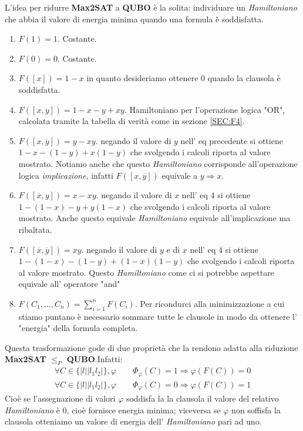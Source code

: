 \documentclass[a4paper]{article}
\begin{document}
L'idea per ridurre \textbf{Max2SAT} a \textbf{QUBO} è la solita: individuare un \textit{Hamiltoniano} che abbia il valore di energia minima quando una formula è soddisfatta.
\begin{enumerate}
	\item $F(1)=1$. Costante. 
	\item $F(0)=0$. Costante. 
	\item $F([x])=1-x$ in quanto desideriamo ottenere 0 quando la clausola è soddisfatta.
	\item $F([x,y])= 1-x-y +xy$. Hamiltoniano per l'operazione logica "OR", calcolata tramite la tabella di verità come in sezione \ref{SEC:F4}.
	\item $F([x,\overline y])= y - xy$. negando il valore di $y$ nell' eq precedente si ottiene $1-x-(1-y)+x(1-y)$ che svolgendo i calcoli riporta al valore mostrato.
		Notiamo anche che questo \textit{Hamiltoniano} corrisponde all'operazione logica \textit{implicazione}, infatti $F([x,\overline y])$ equivale a $ y \Rightarrow x$.
	\item $F([\overline x, y])= x - xy$. negando il valore di $x$ nell' eq 4 si ottiene $1-(1-x)-y+y(1-x)$ che svolgendo i calcoli riporta al valore mostrato.
		Anche questo equivale \textit{Hamiltoniano} equivale all'implicazione ma ribaltata.
	\item $F([\overline x,\overline y])= xy$. negando il valore di $y$ e di $x$ nell' eq 4 si ottiene $1-(1-x)-(1-y)+(1-x)(1-y)$ che svolgendo i calcoli riporta al valore mostrato.
		Questo \textit{Hamiltoniano} come ci si potrebbe aspettare equivale all' operatore "and"
	\item $F(C_1,...,C_n) = \sum_{i=1}^n F(C_i)$. Per ricondurci alla minimizzazione a cui stiamo puntano è necessario sommare tutte le clausole in modo da ottenere l' "energia" della formula completa.
\end{enumerate}
Questa trasformazione gode di due proprietà che la rendono adatta alla riduzione \textbf{Max2SAT} $\leq_P$ \textbf{QUBO}.Infatti:
\begin{align*}
\forall C \in \{\lvert l \rvert \lvert l_1 l_2 \rvert\}, \varphi \qquad \Phi_{\varphi}(C) = 1 \Rightarrow \varphi(F(C)) = 0 \\ 
\forall C \in \{\lvert l \rvert \lvert l_1 l_2 \rvert\}, \varphi \qquad \Phi_{\varphi}(C) = 0 \Rightarrow \varphi(F(C)) = 1 
\end{align*}
Cioè se l'assegnazione di valori $\varphi$ soddisfa la la clausola il valore del relativo \textit{Hamiltoniano} è $0$, cioè fornisce energia minima; viceversa se $\varphi$ non soffisfa la clausola otteniamo un valore di energia dell' \textit{Hamiltoniano} pari ad uno.
\end{document}

